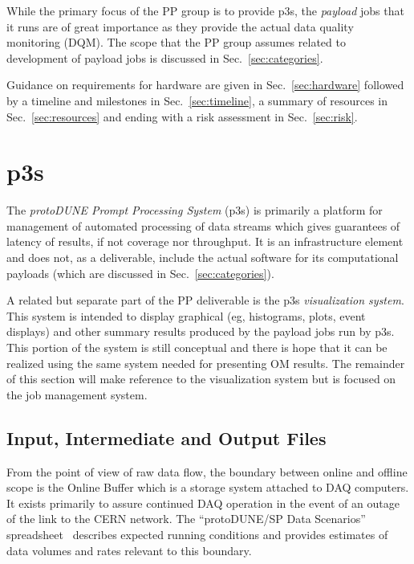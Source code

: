 \documentclass[pdftex,12pt,letter]{article}
\newcommand{\pd}{protoDUNE\xspace}
\begin{document}
While the primary focus of the PP group is to provide p3s, the
\textit{payload} jobs that it runs are of great importance as they
provide the actual data quality monitoring (DQM).  The scope that the
PP group assumes related to development of payload jobs is discussed
in Sec.~\ref{sec:categories}.

Guidance on requirements for hardware are given in
Sec.~\ref{sec:hardware} followed by a timeline and milestones in
Sec.~\ref{sec:timeline}, a summary of resources in
Sec.~\ref{sec:resources} and ending with a risk assessment in
Sec.~\ref{sec:risk}.



\section{p3s}
\label{sec:p3sscope}
The \textit{\pd Prompt Processing System} (p3s) is primarily a
platform for management of automated processing of data streams which
gives guarantees of latency of results, if not coverage nor
throughput.  It is an infrastructure element and does not, as a
deliverable, include the actual software for its computational
payloads (which are discussed in Sec.~\ref{sec:categories}).

A related but separate part of the PP deliverable is the p3s
\textit{visualization system}.  This system is intended to display
graphical (eg, histograms, plots, event displays) and other summary
results produced by the payload jobs run by p3s.  This portion of the
system is still conceptual and there is hope that it can be realized
using the same system needed for presenting OM results.  The remainder
of this section will make reference to the visualization system but is
focused on the job management system.


\subsection{Input, Intermediate and Output Files}
\label{sec:io}

From the point of view of raw data flow, the boundary between online
and offline scope is the Online Buffer which is a storage system
attached to DAQ computers.  It exists primarily to assure continued
DAQ operation in the event of an outage of the link to the CERN
network.  The ``\pd/SP Data Scenarios'' spreadsheet~\cite{docdb1086}
describes expected running conditions and provides estimates of data
volumes and rates relevant to this boundary.
\end{document}
